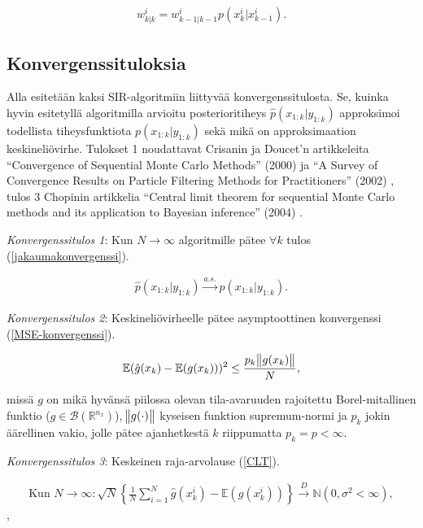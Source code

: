 \documentclass[
  12pt,
  a4paper, twoside]{book}
\begin{document}
\begin{align}\label{uskottavuusotanta-w}
w^i_{k|k} = w^i_{k-1|k-1}p(x^i_k|x^i_{k-1}).
\end{align}

\subsection{Konvergenssituloksia}

Alla esitetään kaksi SIR-algoritmiin liittyvää konvergenssitulosta. Se, kuinka hyvin esitetyllä algoritmilla arvioitu posterioritiheys \(\hat{p}(x_{1:k}|y_{1:k})\) approksimoi todellista tiheysfunktiota \(p(x_{1:k}|y_{1:k})\) sekä mikä on approksimaation keskineliövirhe. Tulokset 1 noudattavat Crisanin ja Doucet'n artikkeleita ``Convergence of Sequential Monte Carlo Methods'' (2000) \citep{crisan-2000} ja ``A Survey of Convergence Results on Particle Filtering Methods for Practitioners'' (2002) \citep{crisan-2002}, tulos 3 Chopinin artikkelia ``Central limit theorem for sequential Monte Carlo methods and its application to Bayesian inference'' (2004) \citep{chopin-2004}.

\textit{Konvergenssitulos 1}: Kun \(N \to \infty\) algoritmille pätee \(\forall k\) tulos (\ref{jakaumakonvergenssi}).

\begin{align}\label{jakaumakonvergenssi}
\hat{p}(x_{1:k}|y_{1:k}) \xrightarrow{a.s.} p(x_{1:k}|y_{1:k}).
\end{align}

\textit{Konvergenssitulos 2}: Keskineliövirheelle pätee asymptoottinen konvergenssi (\ref{MSE-konvergenssi}).

\begin{align}\label{MSE-konvergenssi}
\mathbb{E}(\hat{g}(x_k)-\mathbb{E}(g(x_k)))^2\leq\frac{p_k\norm{g(x_k)}}{N},
\end{align}

\noindent missä \(g\) on mikä hyvänsä piilossa olevan tila-avaruuden rajoitettu Borel-mitallinen funktio (\(g \in \mathcal{B}(\mathbb{R}^{n_x})\)), \(\norm{g(\cdot)}\) kyseisen funktion supremum-normi ja \(p_k\) jokin äärellinen vakio, jolle pätee ajanhetkestä \(k\) riippumatta \(p_k=p<\infty\).

\textit{Konvergenssitulos 3}: Keskeinen raja-arvolause (\ref{CLT}).

\begin{align}\label{CLT}
\text{Kun } N \to \infty: \sqrt{N} \left\{ \frac{1}{N} \sum_{i=1}^N \hat{g}(x_k^i) -\mathbb{E}(g(x_k^i)) \right\} \xrightarrow{D} \mathbb{N}(0,\sigma^2 < \infty),
\end{align},
\end{document}
